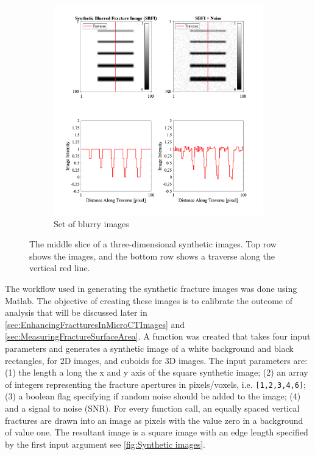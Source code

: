 \documentclass{edger}
\begin{document}
\begin{figure}[!h]
\begin{subfigure}[b]{0.5\textwidth}
            \includegraphics[width=\textwidth]{3DSyntheticBlurredFractureImages.png}
            \caption{Set of blurry images}
            \label{fig:Blurry images}
    \end{subfigure}
    \caption{The middle slice of a three-dimensional synthetic images. Top row shows the images, and the bottom row shows a traverse along the vertical red line. }
    \label{fig:Synthetic images}
\end{figure}

The workflow used in generating the synthetic fracture images was done using Matlab. The objective of creating these images is to calibrate the outcome of analysis that will be discussed later in \autoref{sec:EnhancingFractturesInMicroCTImages} and \autoref{sec:MeasuringFractureSurfaceArea}. A function was created that takes four input parameters and generates a synthetic image of a white background and black rectangles, for 2D images, and cuboids for 3D images. The input parameters are: (1) the length a long the x and y axis of the square synthetic image; (2) an array of integers representing the fracture apertures in pixels/voxels, i.e. \texttt{[1,2,3,4,6]}; (3) a boolean flag specifying if random noise should be added to the image; (4) and a signal to noise (SNR). For every function call, an equally spaced vertical fractures are drawn into an image as pixels with the value zero in a background of value one. The resultant image is a square image with an edge length specified by the first input argument see \autoref{fig:Synthetic images}. 
\end{document}
